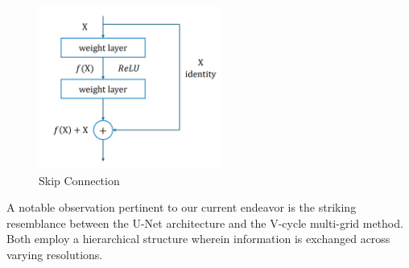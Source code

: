 \begin{figure}[ht]
    \centering
    \includegraphics[width=6cm]{images/Theory-DL/Skip.png}
    \caption{Skip Connection}
    \label{fig:Skip}
\end{figure}
A notable observation pertinent to our current endeavor is the striking resemblance between the U-Net architecture and the V-cycle multi-grid method. Both employ a hierarchical structure wherein information is exchanged across varying resolutions.
